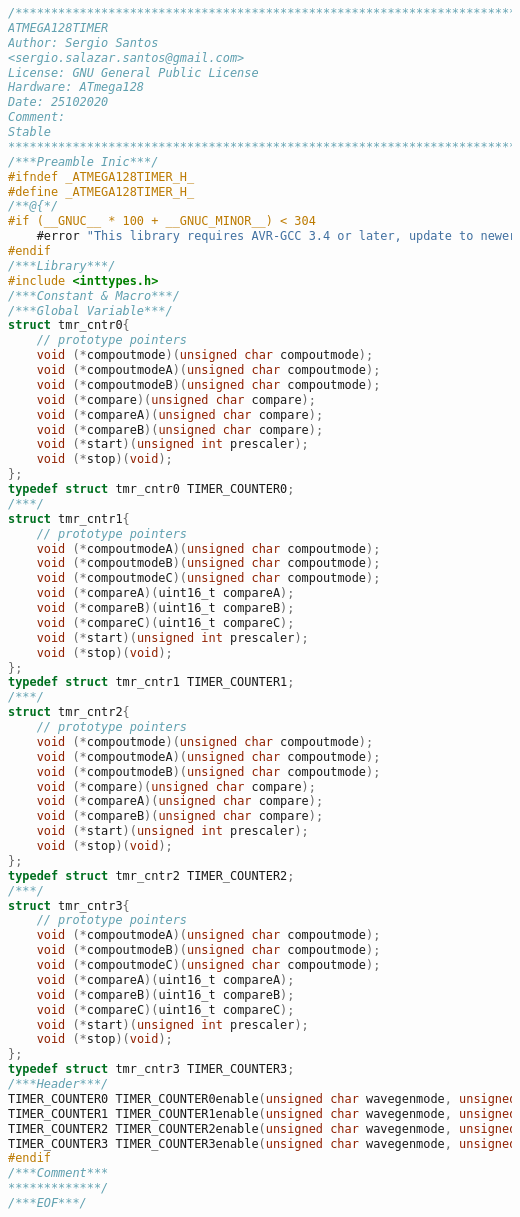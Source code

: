 \begin{lstlisting}[language=C]
/************************************************************************
ATMEGA128TIMER
Author: Sergio Santos 
<sergio.salazar.santos@gmail.com>
License: GNU General Public License
Hardware: ATmega128
Date: 25102020
Comment:
Stable
************************************************************************/
/***Preamble Inic***/
#ifndef _ATMEGA128TIMER_H_
#define _ATMEGA128TIMER_H_
/**@{*/
#if (__GNUC__ * 100 + __GNUC_MINOR__) < 304
	#error "This library requires AVR-GCC 3.4 or later, update to newer AVR-GCC compiler !"
#endif
/***Library***/
#include <inttypes.h>
/***Constant & Macro***/
/***Global Variable***/
struct tmr_cntr0{
	// prototype pointers
	void (*compoutmode)(unsigned char compoutmode);
	void (*compoutmodeA)(unsigned char compoutmode);
	void (*compoutmodeB)(unsigned char compoutmode);
	void (*compare)(unsigned char compare);
	void (*compareA)(unsigned char compare);
	void (*compareB)(unsigned char compare);
	void (*start)(unsigned int prescaler);
	void (*stop)(void);
};
typedef struct tmr_cntr0 TIMER_COUNTER0;
/***/
struct tmr_cntr1{
	// prototype pointers
	void (*compoutmodeA)(unsigned char compoutmode);
	void (*compoutmodeB)(unsigned char compoutmode);
	void (*compoutmodeC)(unsigned char compoutmode);
	void (*compareA)(uint16_t compareA);
	void (*compareB)(uint16_t compareB);
	void (*compareC)(uint16_t compareC);
	void (*start)(unsigned int prescaler);
	void (*stop)(void);
};
typedef struct tmr_cntr1 TIMER_COUNTER1;
/***/
struct tmr_cntr2{
	// prototype pointers
	void (*compoutmode)(unsigned char compoutmode);
	void (*compoutmodeA)(unsigned char compoutmode);
	void (*compoutmodeB)(unsigned char compoutmode);
	void (*compare)(unsigned char compare);
	void (*compareA)(unsigned char compare);
	void (*compareB)(unsigned char compare);
	void (*start)(unsigned int prescaler);
	void (*stop)(void);
};
typedef struct tmr_cntr2 TIMER_COUNTER2;
/***/
struct tmr_cntr3{
	// prototype pointers
	void (*compoutmodeA)(unsigned char compoutmode);
	void (*compoutmodeB)(unsigned char compoutmode);
	void (*compoutmodeC)(unsigned char compoutmode);
	void (*compareA)(uint16_t compareA);
	void (*compareB)(uint16_t compareB);
	void (*compareC)(uint16_t compareC);
	void (*start)(unsigned int prescaler);
	void (*stop)(void);
};
typedef struct tmr_cntr3 TIMER_COUNTER3;
/***Header***/
TIMER_COUNTER0 TIMER_COUNTER0enable(unsigned char wavegenmode, unsigned char interrupt);
TIMER_COUNTER1 TIMER_COUNTER1enable(unsigned char wavegenmode, unsigned char interrupt);
TIMER_COUNTER2 TIMER_COUNTER2enable(unsigned char wavegenmode, unsigned char interrupt);
TIMER_COUNTER3 TIMER_COUNTER3enable(unsigned char wavegenmode, unsigned char interrupt);
#endif
/***Comment***
*************/
/***EOF***/
\end{lstlisting}
